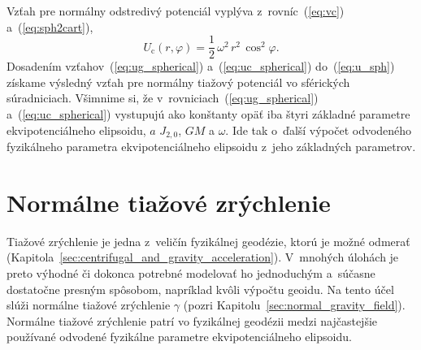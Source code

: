 \documentclass[a4paper,12pt]{book}
\newcommand{\cidx}{\mathrm c}
\begin{document}
Vzťah pre normálny odstredivý potenciál vyplýva z~rovníc~(\ref{eq:vc}) 
a~(\ref{eq:sph2cart}),
%
\begin{equation}
\label{eq:uc_spherical}
U_\cidx(r, \varphi) = \frac{1}{2} \, \omega^2 \, r^2 \, \cos^2\varphi{.}
\end{equation}
%
Dosadením vzťahov~(\ref{eq:ug_spherical}) a~(\ref{eq:uc_spherical}) 
do~(\ref{eq:u_sph}) získame výsledný vzťah pre normálny tiažový potenciál vo 
sférických súradniciach.  Všimnime si, že v~rovniciach~(\ref{eq:ug_spherical}) 
a~(\ref{eq:uc_spherical}) vystupujú ako konštanty opäť iba štyri základné 
parametre ekvipotenciálneho elipsoidu, $a$ $J_{2,0}$, $GM$ a $\omega$.  Ide tak 
o~ďalší výpočet odvodeného fyzikálneho parametra ekvipotenciálneho elipsoidu 
z~jeho základných parametrov.



\section{Normálne tiažové zrýchlenie}
\label{sec:normal_gravity}

Tiažové zrýchlenie je jedna z~veličín fyzikálnej geodézie, ktorú je možné 
odmerať (Kapitola~\ref{sec:centrifugal_and_gravity_acceleration}).  V~mnohých 
úlohách je preto výhodné či dokonca potrebné modelovať ho jednoduchým a~súčasne 
dostatočne presným spôsobom, napríklad kvôli výpočtu geoidu.  Na tento účel 
slúži normálne tiažové zrýchlenie $\gamma$ (pozri 
Kapitolu~\ref{sec:normal_gravity_field}).  Normálne tiažové zrýchlenie patrí vo 
fyzikálnej geodézii medzi najčastejšie používané odvodené fyzikálne parametre 
ekvipotenciálneho elipsoidu.
\end{document}
